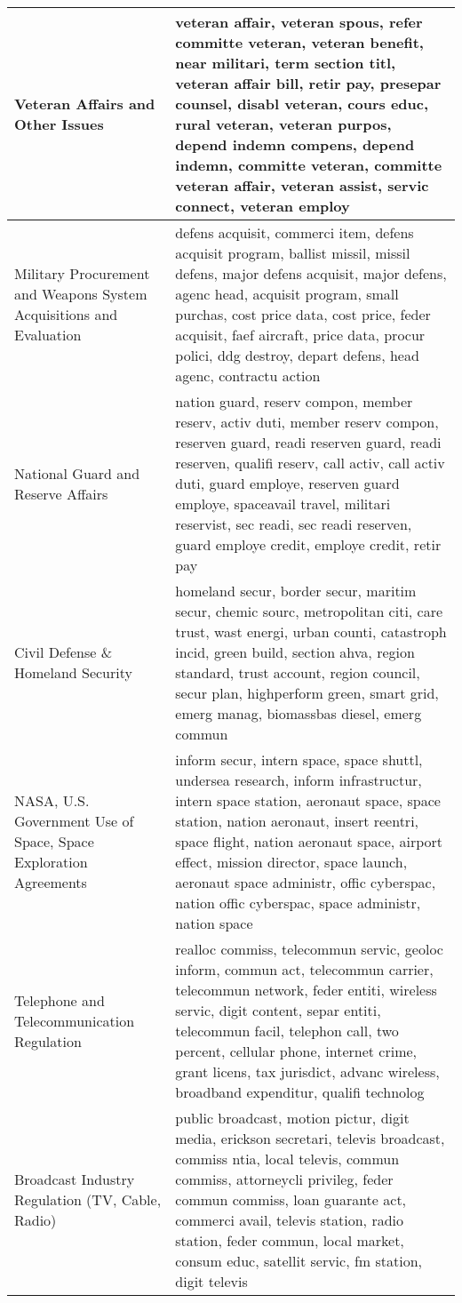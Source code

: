 \begin{longtable}{p{}p{}}
   \hline
Veteran Affairs and Other Issues & veteran affair, veteran spous, refer committe veteran, veteran benefit, near militari, term section titl, veteran affair bill, retir pay, presepar counsel, disabl veteran, cours educ, rural veteran, veteran purpos, depend indemn compens, depend indemn, committe veteran, committe veteran affair, veteran assist, servic connect, veteran employ \\ 
   \hline
Military Procurement and Weapons System Acquisitions and Evaluation & defens acquisit, commerci item, defens acquisit program, ballist missil, missil defens, major defens acquisit, major defens, agenc head, acquisit program, small purchas, cost price data, cost price, feder acquisit, faef aircraft, price data, procur polici, ddg destroy, depart defens, head agenc, contractu action \\ 
   \hline
National Guard and Reserve Affairs & nation guard, reserv compon, member reserv, activ duti, member reserv compon, reserven guard, readi reserven guard, readi reserven, qualifi reserv, call activ, call activ duti, guard employe, reserven guard employe, spaceavail travel, militari reservist, sec readi, sec readi reserven, guard employe credit, employe credit, retir pay \\ 
   \hline
Civil Defense \& Homeland Security & homeland secur, border secur, maritim secur, chemic sourc, metropolitan citi, care trust, wast energi, urban counti, catastroph incid, green build, section ahva, region standard, trust account, region council, secur plan, highperform green, smart grid, emerg manag, biomassbas diesel, emerg commun \\ 
   \hline
NASA, U.S. Government Use of Space, Space Exploration Agreements & inform secur, intern space, space shuttl, undersea research, inform infrastructur, intern space station, aeronaut space, space station, nation aeronaut, insert reentri, space flight, nation aeronaut space, airport effect, mission director, space launch, aeronaut space administr, offic cyberspac, nation offic cyberspac, space administr, nation space \\ 
   \hline
Telephone and Telecommunication Regulation & realloc commiss, telecommun servic, geoloc inform, commun act, telecommun carrier, telecommun network, feder entiti, wireless servic, digit content, separ entiti, telecommun facil, telephon call, two percent, cellular phone, internet crime, grant licens, tax jurisdict, advanc wireless, broadband expenditur, qualifi technolog \\ 
   \hline
Broadcast Industry Regulation (TV, Cable, Radio) & public broadcast, motion pictur, digit media, erickson secretari, televis broadcast, commiss ntia, local televis, commun commiss, attorneycli privileg, feder commun commiss, loan guarante act, commerci avail, televis station, radio station, feder commun, local market, consum educ, satellit servic, fm station, digit televis \\ 

\end{longtable}
